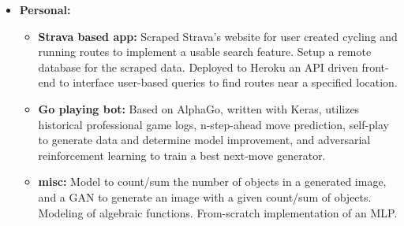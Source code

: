 \documentclass[a4paper,10pt,notitlepage]{article}
\begin{document}
\begin{itemize}
        \vspace{-5pt}\item \textbf{Personal:} 
            \begin{itemize}
                \item \textbf{Strava based app:} Scraped Strava's website for user created cycling and running routes to implement a usable search feature. Setup a remote database for the scraped data. Deployed to Heroku an API driven front-end to interface user-based queries to find routes near a specified location.
                \item \textbf{Go playing bot:} Based on AlphaGo, written with Keras, utilizes historical professional game logs, n-step-ahead move prediction, self-play to generate data and determine model improvement, and adversarial reinforcement learning to train a best next-move generator.
                \item \textbf{misc:} Model to count/sum the number of objects in a generated image, and a GAN to generate an image with a given count/sum of objects. Modeling of algebraic functions. From-scratch implementation of an MLP.
            \end{itemize}
    \end{itemize}
\end{document}
